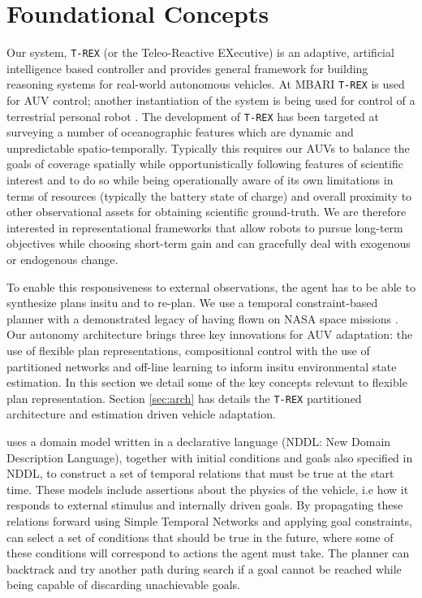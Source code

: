 \section{Foundational Concepts}
\label{sec:concepts}

Our system, \texttt{T-REX} (or the Teleo-Reactive EXecutive) is an
adaptive, artificial intelligence based controller and provides
general framework for building reasoning systems for real-world
autonomous vehicles. At MBARI \texttt{T-REX} is used for AUV control;
another instantiation of the system is being used for control of a
terrestrial personal robot \cite{pr2, Meeussen:2010dn}. The development of
\texttt{T-REX} has been targeted at surveying a number of
oceanographic features which are dynamic and unpredictable
spatio-temporally. Typically this requires our AUVs to balance the
goals of coverage spatially while opportunistically following features
of scientific interest and to do so while being operationally aware of
its own limitations in terms of resources (typically the battery state
of charge) and overall proximity to other observational assets for
obtaining scientific ground-truth. We are therefore interested in
representational frameworks that allow robots to pursue long-term
objectives while choosing short-term gain and can gracefully deal with
exogenous or endogenous change.

To enable this responsiveness to external observations, the agent has
to be able to synthesize plans insitu and to re-plan. We use a
temporal constraint-based planner \eu with a demonstrated legacy of
having flown on NASA space missions \cite{jonsson00,bresina05,
  barreiro09}. Our autonomy architecture brings three key innovations
for AUV adaptation: the use of flexible plan representations,
compositional control with the use of partitioned networks and
off-line learning to inform insitu environmental state estimation. In
this section we detail some of the key concepts relevant to flexible
plan representation. Section \ref{sec:arch} has details the
\texttt{T-REX} partitioned architecture and estimation driven vehicle
adaptation.

\eu uses a domain model written in a declarative language (NDDL: New
Domain Description Language), together with initial conditions and
goals also specified in NDDL, to construct a set of temporal relations
that must be true at the start time. These models include assertions
about the physics of the vehicle, i.e how it responds to external
stimulus and internally driven goals. By propagating these relations
forward using Simple Temporal Networks \cite{dechter91} and applying
goal constraints, \eu can select a set of conditions that should be
true in the future, where some of these conditions will correspond to
actions the agent must take. The planner can backtrack and try another
path during search if a goal cannot be reached while being capable of
discarding unachievable goals.

